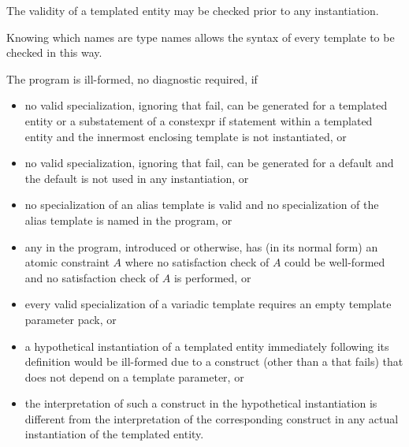 \pnum
{}%
%
The validity of a templated entity may be checked prior to any instantiation.
\begin{note}
Knowing which names are type names allows the syntax of every template
to be checked in this way.
\end{note}
The program is ill-formed, no diagnostic required, if
\begin{itemize}
\item
no valid specialization,
ignoring  that fail,
can be generated for a templated entity
or a substatement of a constexpr if statement
within a templated entity
and the innermost enclosing template is not instantiated, or
\item
no valid specialization,
ignoring  that fail,
can be generated for a default  and
the default  is not used in any instantiation, or
\item
no specialization of an alias template is valid and
no specialization of the alias template is named in the program, or
\item
any  in the program, introduced or otherwise,
has (in its normal form) an atomic constraint $A$ where
no satisfaction check of $A$ could be well-formed and
no satisfaction check of $A$ is performed, or
\item
every valid specialization of a variadic template requires an empty template
parameter pack, or
\item
a hypothetical instantiation of a templated entity
immediately following its definition
would be ill-formed
due to a construct
(other than a  that fails)
that does not depend on a template parameter, or
\item
the interpretation of such a construct
in the hypothetical instantiation
is different from
the interpretation of the corresponding construct
in any actual instantiation of the templated entity.
\end{itemize}

